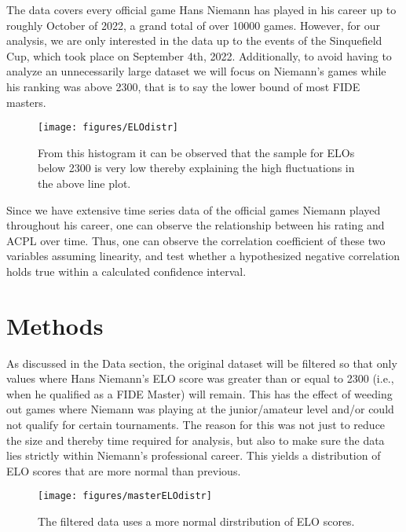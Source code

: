 \documentclass[12pt, letterpaper, titlepage]{article}
\begin{document}
The data covers every official game Hans Niemann has played in his career up to roughly October of 2022, a 
grand total of over 10000 games. However, for our analysis, we are only interested in the data up to the 
events of the Sinquefield Cup, which took place on September 4th, 2022. Additionally, to avoid having to 
analyze an unnecessarily large dataset we will focus on Niemann's games while his ranking was above 2300, 
that is to say the lower bound of most FIDE masters.

\begin{figure}[!htb]
    \centering
    \texttt{[image: figures/ELOdistr]}
    \caption{From this histogram it can be observed that the sample for ELOs below 2300 is very low thereby 
    explaining the high fluctuations in the above line plot.}
    \label{fig:elo_histplot}
\end{figure}

Since we have extensive time series data of the official games Niemann played throughout his career, one can
 observe the relationship between his rating and ACPL over time. Thus, one can observe the correlation 
 coefficient of these two variables assuming linearity, and test whether a hypothesized negative correlation
  holds true within a calculated confidence interval.

\section{Methods}
\label{sec:meth}

As discussed in the Data section, the original dataset will be filtered so that only values where Hans 
Niemann's ELO score was greater than or equal to 2300 (i.e., when he qualified as a FIDE Master) will remain. 
This has the effect of weeding out games where Niemann was playing at the junior/amateur level and/or could 
not qualify for certain tournaments. The reason for this was not just to reduce the size and thereby time 
required for analysis, but also to make sure the data lies strictly within Niemann's professional career. 
This yields a distribution of ELO scores that are more normal than previous.

\begin{figure}[!htb]
    \centering
    \texttt{[image: figures/masterELOdistr]}
    \caption{The filtered data uses a more normal dirstribution of ELO scores.}
    \label{fig:elogt23_histplot}
\end{figure}
\end{document}
